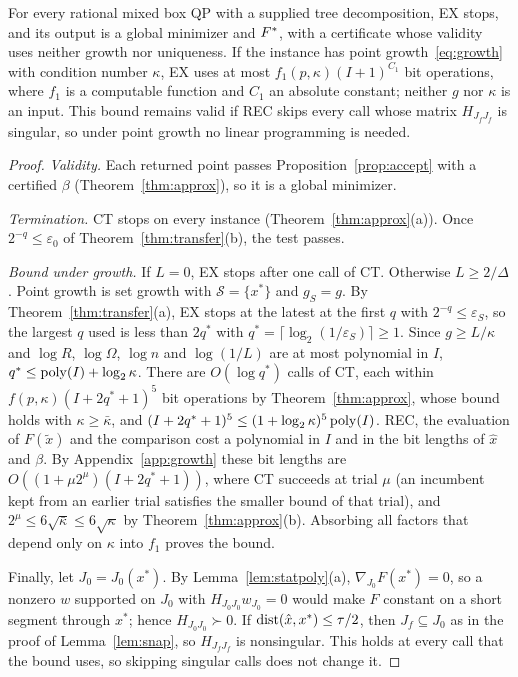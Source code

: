 \begin{theorem}\label{thm:exact}
For every rational mixed box QP with a supplied tree decomposition, EX
stops, and its output is a global minimizer and $F^{*}$, with a certificate
whose validity uses neither growth nor uniqueness. If the instance has point
growth~\eqref{eq:growth} with condition number $\kappa$, EX uses at most
$f_1(p,\kappa)(I+1)^{C_1}$ bit operations, where $f_1$ is a computable
function and $C_1$ an absolute constant; neither $g$ nor $\kappa$ is an
input. This bound remains valid if REC skips every call whose matrix
$H_{J_fJ_f}$ is singular, so under point growth no linear programming is
needed.
\end{theorem}

\begin{proof}
\emph{Validity.} Each returned point passes Proposition~\ref{prop:accept}
with a certified $\beta$ (Theorem~\ref{thm:approx}), so it is a global
minimizer.

\emph{Termination.} CT stops on every instance
(Theorem~\ref{thm:approx}(a)). Once $2^{-q}\le\varepsilon_0$ of
Theorem~\ref{thm:transfer}(b), the test passes.

\emph{Bound under growth.} If $L=0$, EX stops after one call of CT. Otherwise
$L\ge2/\Delta$. Point growth is set growth with $\mathcal S=\{x^*\}$ and
$g_S=g$. By Theorem~\ref{thm:transfer}(a), EX stops at the latest at the first
$q$ with $2^{-q}\le\varepsilon_S$, so the largest $q$ used is less than $2q^*$
with $q^*=\lceil\log_2(1/\varepsilon_S)\rceil\ge1$. Since $g\ge L/\kappa$ and
$\log R$, $\log \Omega$, $\log n$ and $\log(1/L)$ are at most polynomial in
$I$, $q^*\le\operatorname{poly}(I)+\log_2\kappa$. There are $O(\log q^*)$ calls of CT, each
within $f(p,\kappa)(I+2q^*+1)^5$ bit operations by Theorem~\ref{thm:approx},
whose bound holds with $\kappa\ge\bar\kappa$, and
$(I+2q^*+1)^5\le(1+\log_2\kappa)^5\operatorname{poly}(I)$. REC, the evaluation of
$F(\tilde x)$ and the comparison cost a polynomial in $I$ and in the bit
lengths of $\hat x$ and $\beta$. By Appendix~\ref{app:growth} these bit
lengths are $O((1+\mu2^\mu)(I+2q^*+1))$, where CT succeeds at trial $\mu$
(an incumbent kept from an earlier trial satisfies the smaller bound of that
trial), and $2^\mu\le6\sqrt{\bar\kappa}\le6\sqrt\kappa$ by
Theorem~\ref{thm:approx}(b). Absorbing all factors that depend only on
$\kappa$ into $f_1$ proves the bound.

Finally, let $J_0=J_0(x^*)$. By Lemma~\ref{lem:statpoly}(a),
$\nabla_{J_0}F(x^*)=0$, so a nonzero $w$ supported on $J_0$ with
$H_{J_0J_0}w_{J_0}=0$ would make $F$ constant on a short segment through
$x^*$; hence $H_{J_0J_0}\succ0$. If $\operatorname{dist}(\hat x,x^*)\le\tau/2$, then
$J_f\subseteq J_0$ as in the proof of Lemma~\ref{lem:snap}, so $H_{J_fJ_f}$ is
nonsingular. This holds at every call that the bound uses, so skipping
singular calls does not change it.
\end{proof}

